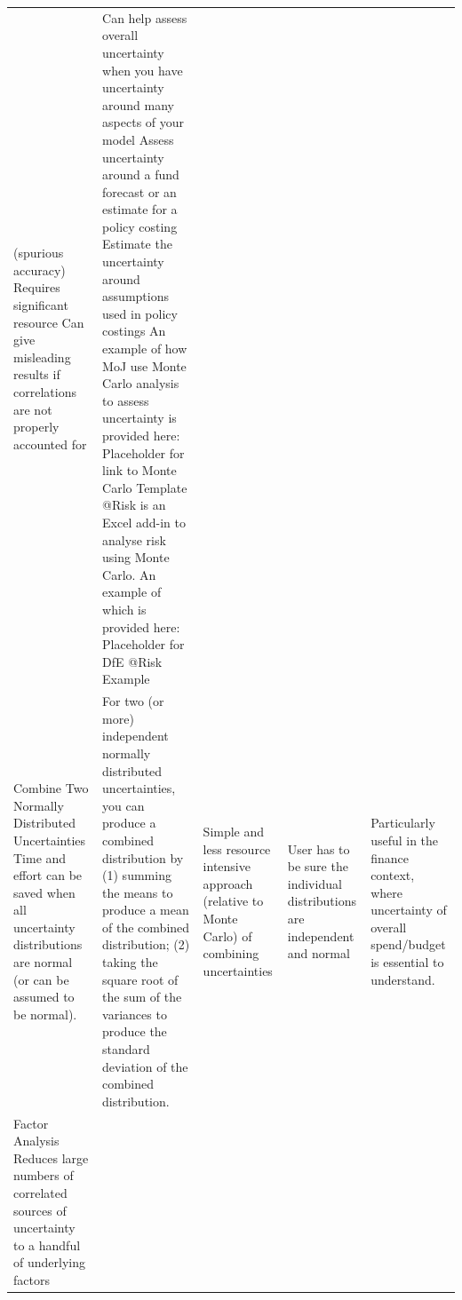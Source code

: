\documentclass[]{book}
\begin{document}
\begin{longtable}[]{@{}lllll@{}}
\begin{minipage}[t]{0.16\columnwidth}
(spurious accuracy) Requires significant resource Can give misleading
results if correlations are not properly accounted for\strut
\end{minipage} & \begin{minipage}[t]{0.13\columnwidth}\raggedright\strut
Can help assess overall uncertainty when you have uncertainty around
many aspects of your model Assess uncertainty around a fund forecast or
an estimate for a policy costing Estimate the uncertainty around
assumptions used in policy costings An example of how MoJ use Monte
Carlo analysis to assess uncertainty is provided here: Placeholder for
link to Monte Carlo Template @Risk is an Excel add-in to analyse risk
using Monte Carlo. An example of which is provided here: Placeholder for
DfE @Risk Example\strut
\end{minipage}\tabularnewline
\begin{minipage}[t]{0.16\columnwidth}\raggedright\strut
 Combine Two Normally Distributed Uncertainties Time and effort can be
saved when all uncertainty distributions are normal (or can be assumed
to be normal).\strut
\end{minipage} & \begin{minipage}[t]{0.26\columnwidth}\raggedright\strut
For two (or more) independent normally distributed uncertainties, you
can produce a combined distribution by (1) summing the means to produce
a mean of the combined distribution; (2) taking the square root of the
sum of the variances to produce the standard deviation of the combined
distribution.\strut
\end{minipage} & \begin{minipage}[t]{0.16\columnwidth}\raggedright\strut
Simple and less resource intensive approach (relative to Monte Carlo) of
combining uncertainties\strut
\end{minipage} & \begin{minipage}[t]{0.16\columnwidth}\raggedright\strut
User has to be sure the individual distributions are independent and
normal\strut
\end{minipage} & \begin{minipage}[t]{0.13\columnwidth}\raggedright\strut
Particularly useful in the finance context, where uncertainty of overall
spend/budget is essential to understand.\strut
\end{minipage}\tabularnewline
\begin{minipage}[t]{0.16\columnwidth}\raggedright\strut
Factor Analysis Reduces large numbers of correlated sources of
uncertainty to a handful of underlying factors\strut

\end{minipage}
\end{longtable}
\end{document}
